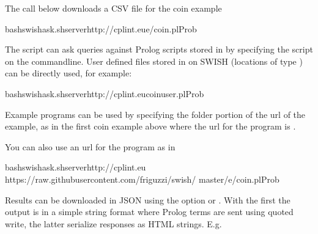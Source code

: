 \documentclass[letterpaper,10pt,english]{sphinxmanual}
\begin{document}
\sphinxAtStartPar
The call below downloads a CSV file for the coin example

\begin{sphinxVerbatim}[commandchars=\\\{\}]
bashswish\PYGZhy{}ask.sh\PYGZhy{}\PYGZhy{}serverhttp://cplint.eue/coin.plProb
\end{sphinxVerbatim}

\sphinxAtStartPar
The script can ask queries against Prolog scripts stored in  by specifying the script on the commandline.
User defined files stored in  on SWISH (locations of type ) can be directly used, for example:

\begin{sphinxVerbatim}[commandchars=\\\{\}]
bashswish\PYGZhy{}ask.sh\PYGZhy{}\PYGZhy{}serverhttp://cplint.eucoin\PYGZus{}user.plProb
\end{sphinxVerbatim}

\sphinxAtStartPar
Example programs can be used by specifying the folder portion of the url of the example, as in the first coin example above where the url for the program is .

\sphinxAtStartPar
You can also use an url for the program as in

\begin{sphinxVerbatim}[commandchars=\\\{\}]
bashswish\PYGZhy{}ask.sh\PYGZhy{}\PYGZhy{}serverhttp://cplint.eu
https://raw.githubusercontent.com/friguzzi/swish/
master/e/coin.plProb
\end{sphinxVerbatim}

\sphinxAtStartPar
Results can be downloaded in JSON using the option  or . With the first the output is in a simple string format where Prolog terms are sent using quoted write, the latter serialize responses as HTML strings.
E.g.
\end{document}
